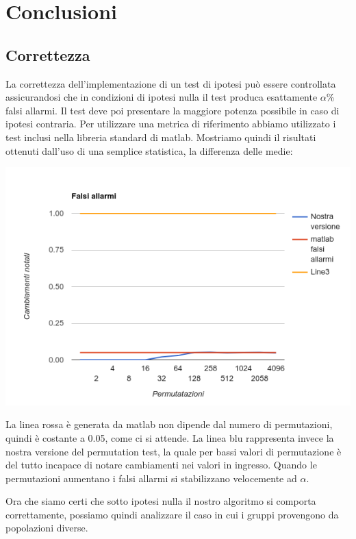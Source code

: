 \section{Conclusioni}

\subsection{Correttezza}
La correttezza dell'implementazione di un test di ipotesi può essere controllata assicurandosi che in condizioni di ipotesi nulla il test produca esattamente $\alpha$\% falsi allarmi. Il test deve poi presentare la maggiore potenza possibile in caso di ipotesi contraria. Per utilizzare una metrica di riferimento abbiamo utilizzato i test inclusi nella libreria standard di matlab.
Mostriamo quindi il risultati ottenuti dall'uso di una semplice statistica, la differenza delle medie:

\includegraphics[width=\linewidth]{falsi_allarmi}

La linea rossa è generata da matlab non dipende dal numero di permutazioni, quindi è costante a 0.05, come ci si attende. La linea blu rappresenta invece la nostra versione del permutation test, la quale per bassi valori di permutazione è del tutto incapace di notare cambiamenti nei valori in ingresso. Quando le permutazioni aumentano i falsi allarmi si stabilizzano velocemente ad $\alpha$. 

Ora che siamo certi che sotto ipotesi nulla il nostro algoritmo si comporta correttamente, possiamo quindi analizzare il caso in cui i gruppi provengono da popolazioni diverse.

